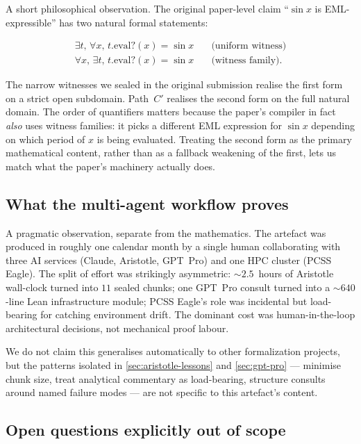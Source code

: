 \documentclass[11pt,a4paper]{article}
\theoremstyle{plain}
\theoremstyle{definition}
\begin{document}
A short philosophical observation. The original paper-level claim
``$\sin x$ is EML-expressible'' has two natural formal statements:

\begin{align*}
  \exists t,\, \forall x,\, t.\mathrm{eval?}(x) = \sin x
    &\quad \text{(uniform witness)} \\
  \forall x,\, \exists t,\, t.\mathrm{eval?}(x) = \sin x
    &\quad \text{(witness family)}.
\end{align*}

The narrow witnesses we sealed in the original submission realise the
first form on a strict open subdomain. Path~$C'$ realises the second
form on the full natural domain. The order of quantifiers matters
because the paper's compiler in fact \emph{also} uses witness
families: it picks a different EML expression for $\sin x$ depending
on which period of $x$ is being evaluated. Treating the second form
as the primary mathematical content, rather than as a fallback
weakening of the first, lets us match what the paper's machinery
actually does.

\subsection*{What the multi-agent workflow proves}

A pragmatic observation, separate from the mathematics. The artefact
was produced in roughly one calendar month by a single human
collaborating with three AI services (Claude, Aristotle, GPT~Pro) and
one HPC cluster (PCSS Eagle). The split of effort was strikingly
asymmetric: $\sim$$2.5$~hours of Aristotle wall-clock turned into
$11$ sealed chunks; one GPT~Pro consult turned into a $\sim$$640$-line
Lean infrastructure module; PCSS Eagle's role was incidental but
load-bearing for catching environment drift. The dominant cost was
human-in-the-loop architectural decisions, not mechanical proof
labour.

We do not claim this generalises automatically to other formalization
projects, but the patterns isolated in \cref{sec:aristotle-lessons}
and \cref{sec:gpt-pro} --- minimise chunk size, treat analytical
commentary as load-bearing, structure consults around named failure
modes --- are not specific to this artefact's content.

\subsection*{Open questions explicitly out of scope}
\end{document}
